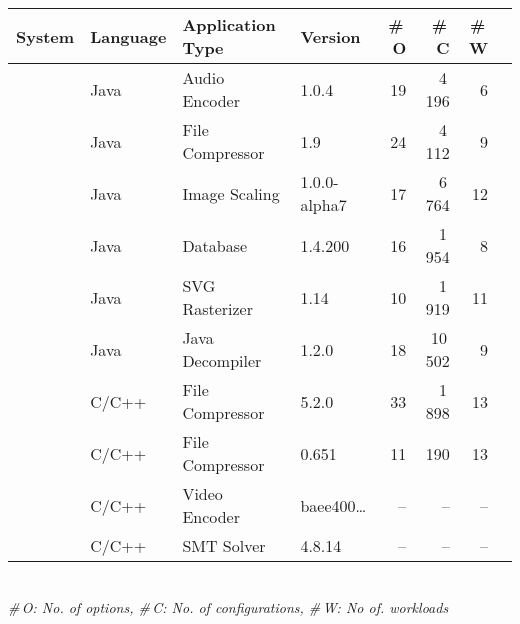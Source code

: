 \begin{tabular}{p{1cm}lp{2.0cm}lrrrr}
		\toprule
		\textbf{System} & \textbf{Language} & \textbf{Application Type} & \textbf{Version} & \textbf{\#\,O} & \textbf{\#\,C} & \textbf{\#\,W}  \\
		\midrule
		\jumper & Java & Audio Encoder & 1.0.4 & 19 & 4\,196 & 6   \\
		
		\kanzi &Java  & File Compressor & 1.9 & 24 & 4\,112 & 9 \\
			
		\dconvert & Java & Image Scaling & 1.0.0-alpha7 & 17 & 6\,764 & 12  \\
				
		\htwo & Java & Database & 1.4.200 & 16 & 1\,954  & 8  \\
		
		\batik & Java & SVG Rasterizer & 1.14 & 10 & 1\,919 &  11  \\
		
		\jadx & Java & Java Decompiler & 1.2.0 & 18 & 10\,502 & 9  \\
		
		
		 \xz & C/C++ & File Compressor & 5.2.0 & 33 & 1\,898 & 13  \\
		\lrzip & C/C++ & File Compressor & 0.651 & 11 & 190 & 13  \\
		\midrule
		\rowcolor{green!70!black}\xzwo & C/C++ & Video Encoder & baee400\ldots & -- & -- & --  \\
		\rowcolor{green!70!black}\zdrei & C/C++ & SMT Solver & 4.8.14 & -- & -- & --  \\
\bottomrule

\end{tabular}\\
{\centering\vspace{1mm}\textit{\#\,O: No. of options, \#\,C: No. of configurations, \#\,W: No of. workloads}}

